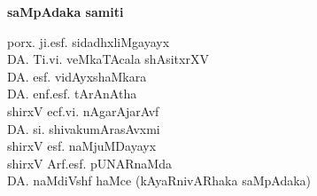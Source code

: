 \phantom{a}

\vfill

\begin{center}
{\Large\bf saMpAdaka samiti}

\bigskip
\medskip

{\fontsize{14pt}{16pt}\selectfont
porx. ji.esf. sidadhxliMgayayx\\[8pt]
DA. Ti.vi. veMkaTAcala shAsitxrXV\\[8pt]
DA. esf. vidAyxshaMkara\\[8pt]
DA. enf.esf. tArAnAtha\\[8pt]
shirxV ecf.vi. nAgarAjarAvf\\[8pt]
DA. si. shivakumArasAvxmi\\[8pt]
shirxV esf. naMjuMDayayx\\[8pt]
shirxV Arf.esf. pUNARnaMda\\[8pt]
DA. naMdiVshf haMce (kAyaRnivARhaka saMpAdaka)}\relax
\end{center}

\vfill

\phantom{a}







